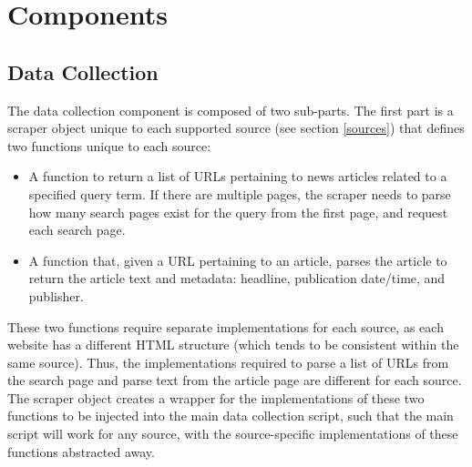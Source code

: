 \documentclass{report}
\begin{document}
\section{Components} \label{Components}

\subsection{Data Collection} \label{des-data-collection}

The data collection component is composed of two sub-parts.
The first part is a scraper object unique to each supported source (see section \ref{sources}) that defines two functions unique to each source:
\begin{itemize}
	\item A function to return a list of URLs pertaining to news articles related to a specified query term.
		If there are multiple pages, the scraper needs to parse how many search pages exist for the query from the first page, and request each search page.
	\item A function that, given a URL pertaining to an article, parses the article to return the article text and metadata: headline, publication date/time, and publisher.
\end{itemize}
These two functions require separate implementations for each source, as each website has a different HTML structure (which tends to be consistent within the same source).
Thus, the implementations required to parse a list of URLs from the search page and parse text from the article page are different for each source.
The scraper object creates a wrapper for the implementations of these two functions to be injected into the main data collection script, such that the main script will work for any source, with the source-specific implementations of these functions abstracted away.
\end{document}
